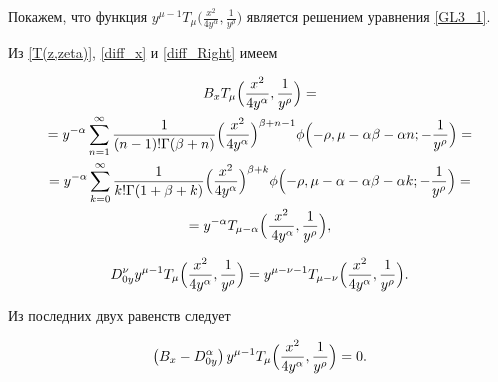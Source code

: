 Покажем, что функция $y^{\mu-1} T_{\mu}\bigl(\frac{x^2}{4y^{\alpha}},\frac{1}{y^{\rho}}\bigr)$ является решением уравнения \eqref{GL3_1}. 

Из \eqref{T(z,zeta)}, \eqref{diff_x}  и \eqref{diff_Right} имеем

\begin{multline}

B_x T_{\mu}\Bigl(\frac{x^2}{4y^{\alpha}},\frac{1}{y^{\rho}}\Bigr)=

\\

=y^{-\alpha}\sum\limits_{n=1}^{\infty}\frac{1}{(n-1)! \Gamma(\beta+n)}

\Bigl(\frac{x^2}{4y^{\alpha}}\Bigr)^{\beta+n-1}

\phi\Bigl(-\rho,\mu-\alpha\beta-\alpha n; -\frac{1}{y^{\rho}}\Bigr)=

\\

=y^{-\alpha}\sum\limits_{k=0}^{\infty}\frac{1}{k! \Gamma(1+\beta+k)}

\Bigl(\frac{x^2}{4y^{\alpha}}\Bigr)^{\beta+k}

\phi\Bigl(-\rho,\mu-\alpha-\alpha\beta-\alpha k; -\frac{1}{y^{\rho}}\Bigr)=

\\ 

=y^{-\alpha} T_{\mu-\alpha}\Bigl(\frac{x^2}{\,4y^{\alpha}},\frac{1}{y^{\rho}}\Bigr),

\end{multline}   

\begin{equation}

\label{DT(z,zeta)}  

D_{0y}^{\nu} y^{\mu-1} T_{\mu}\Bigl(\frac{x^2}{4y^{\alpha}},\frac{1}{y^{\rho}}\Bigr)=

y^{\mu-\nu-1} T_{\mu-\nu}\Bigl(\frac{x^2}{4y^{\alpha}},\frac{1}{y^{\rho}}\Bigr).

\end{equation}



Из последних двух равенств следует

\begin{equation} \label{BDyT}  

\left(B_x-D_{0y}^{\alpha}\right)y^{\mu-1} T_{\mu}\Bigl(\frac{x^2}{4y^{\alpha}}, \frac{1}{y^{\rho}}\Bigr)=0.

\end{equation}   





